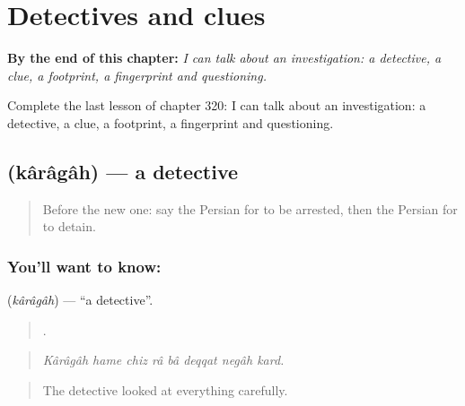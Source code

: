 
\chapter{Detectives and clues}
\label{ch:fa-detectives-and-clues}

\begin{chapteropening}
\textbf{By the end of this chapter:} \emph{I can talk about an investigation: a detective, a clue, a footprint, a fingerprint and questioning.}

Complete the last lesson of chapter 320: I can talk about an investigation: a detective, a clue, a footprint, a fingerprint and questioning.
\end{chapteropening}

\section[\texorpdfstring{\fa{کارآگاه} (kârâgâh)}{کارآگاه (kârâgâh)}]{ (kârâgâh) — a detective}

\label{lesson:FA-C320-karagah}



\begin{quote}
Before the new one: say the Persian for to be arrested, then the Persian for to detain.
\end{quote}

\subsection*{You'll want to know: }
\textbf{} (\emph{kârâgâh}) — \textquotedblleft{}a detective\textquotedblright{}.

\begin{quote}
       .
\end{quote}

\begin{quote}
\emph{Kârâgâh hame chiz râ bâ deqqat negâh kard.}
\end{quote}

\begin{quote}
The detective looked at everything carefully.
\end{quote}

